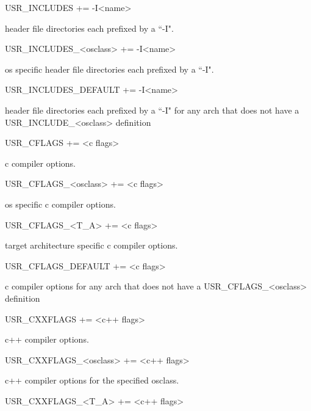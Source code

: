 \begin{description}

\item {}USR\_INCLUDES += -I\textless{}name\textgreater{}

header file directories each prefixed by a ``-I".

\item USR\_INCLUDES\_\textless{}osclass\textgreater{} += -I\textless{}name\textgreater{}

os specific header file directories each prefixed by a ``-I".

\item USR\_INCLUDES\_DEFAULT += -I\textless{}name\textgreater{}

header file directories each prefixed by a ``-I" for any arch that does not have a USR\_INCLUDE\_\textless{}osclass\textgreater{} 
definition

\item {}USR\_CFLAGS += \textless{}c flags\textgreater{}

c compiler options.

\item USR\_CFLAGS\_\textless{}osclass\textgreater{} += \textless{}c flags\textgreater{}

os specific c compiler options.

\item USR\_CFLAGS\_\textless{}T\_A\textgreater{} += \textless{}c flags\textgreater{}

target architecture specific c compiler options.

\item USR\_CFLAGS\_DEFAULT += \textless{}c flags\textgreater{}

c compiler options for any arch that does not have a USR\_CFLAGS\_\textless{}osclass\textgreater{} definition

\item {}USR\_CXXFLAGS += \textless{}c++ flags\textgreater{}

c++ compiler options.

\item USR\_CXXFLAGS\_\textless{}osclass\textgreater{} += \textless{}c++ flags\textgreater{}

c++ compiler options for the specified osclass.

\item USR\_CXXFLAGS\_\textless{}T\_A\textgreater{} += \textless{}c++ flags\textgreater{}


\end{description}
